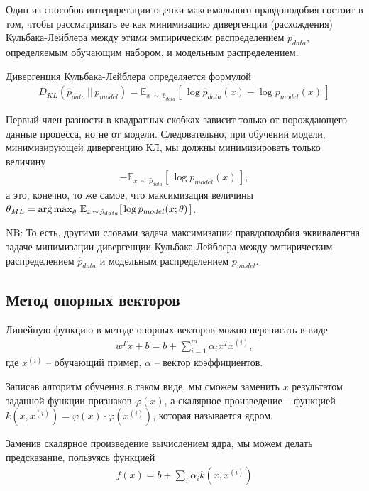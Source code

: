 \documentclass[%
	11pt,
	a4paper,
	utf8,
]{article}
\begin{document}
{\color{blue}Один из способов интерпретации оценки максимального правдоподобия состоит в том, чтобы рассматривать ее как минимизацию дивергенции (расхождения) Кульбака-Лейблера между этими эмпирическим распределением $ \hat{p}_{data} $, определяемым обучающим набором, и модельным распределением.}

Дивергенция Кульбака-Лейблера определяется формулой
\begin{align*}
	D_{KL}(\hat{p}_{data} \, || \, p_{model}) = \mathbb{E}_{ x \, \sim \, \hat{p}_{data} } [\, \log \hat{p}_{data}(x) - \log p_{model}(x) \, ]
\end{align*}

Первый член разности в квадратных скобках зависит только от порождающего данные процесса, но не от модели. Следовательно, при обучении модели, минимизирующей дивергенцию КЛ, мы должны минимизировать только величину
\begin{align*}
	- \mathbb{E}_{ x \, \sim \, \hat{p}_{data} }[\, \log p_{model}(x) \,],
\end{align*}
а это, конечно, то же самое, что максимизация величины $ \theta_{ML} = \operatorname*{arg\,max}_{\theta} \, \mathbb{E}_{x \, \sim \, \hat{p}_{data}} [\, \log p_{model} (x; \theta) \,] $.

NB: То есть, другими словами задача максимизации правдоподобия эквивалентна задаче минимизации дивергенции Кульбака-Лейблера между эмпирическим распределением $ \hat{p}_{data} $ и модельным распределением $ p_{model} $.

\subsection{Метод опорных векторов}

Линейную функцию в методе опорных векторов можно переписать в виде
\begin{align*}
	w^{T} x + b = b + \sum_{i=1}^{m} \alpha_i x^{T} x^{(i)},
\end{align*}
где $ x^{(i)} $ -- обучающий пример, $ \alpha $ -- вектор коэффициентов.

Записав алгоритм обучения в таком виде, мы сможем заменить $ x $ результатом заданной функции признаков $ \varphi(x) $, а скалярное произведение -- функцией $ k(x, x^{(i)}) = \varphi(x) \cdot \varphi(x^{(i)}) $, которая называется ядром.

Заменив скалярное произведение вычислением ядра, мы можем делать предсказание, пользуясь функцией
\begin{align*}
	f(x) = b + \sum_{i} \alpha_i k(x, x^{(i)})
\end{align*}
\end{document}
